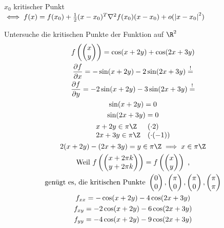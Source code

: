$x_0$ kritischer Punkt $\iff f(x) = f(x_0) + \frac{1}{2} (x-x_0)^T \nabla^2 f(x_0)(x-x_0) + o(\abs{x-x_0}^2)$
\begin{bsp*}
	Untersuche die kritischen Punkte der Funktion auf $\R^2$
	\begin{gather*}
		f\left(\begin{pmatrix} x \\ y \end{pmatrix}\right) = \cos(x + 2y) + \cos(2x + 3y) \\
		\frac{\partial f}{\partial x} = -\sin(x + 2y) - 2\sin(2x + 3y) \overset{!}{=} \\
		\frac{\partial f}{\partial y} = -2\sin(x + 2y) - 3\sin(2x + 3y) \overset{!}{=} \\
		\sin(x + 2y) = 0 \\
		\sin(2x + 3y) = 0 \\
		\begin{matrix*}[l]
			x + 2y \in \pi\Z	&(\cdot 2) \\
			2x + 3y \in \pi\Z	&(\cdot (-1))
		\end{matrix*} \\
		2(x + 2y) - (2x + 3y) = y \in \pi\Z \implies x \in \pi\Z \\
		\text{Weil } f\left(\begin{pmatrix} x + 2\pi k \\ y + 2\pi k \end{pmatrix}\right) = f\left(\begin{pmatrix} x \\ y \end{pmatrix}\right) \text{ ,} \\
		\text{genügt es, die kritischen Punkte } \begin{pmatrix} 0 \\ 0 \end{pmatrix} , \begin{pmatrix} \pi \\ 0 \end{pmatrix} , \begin{pmatrix} \pi \\ 0 \end{pmatrix} , \begin{pmatrix} \pi \\ \pi \end{pmatrix} \\
		f_{xx} = -\cos(x + 2y) - 4\cos(2x + 3y) \\
		f_{xy} = -2\cos(x + 2y) - 6\cos(2x + 3y) \\
		f_{yy} = -4\cos(x + 2y) - 9\cos(2x + 3y) \\

\end{gather*}
\end{bsp*}
